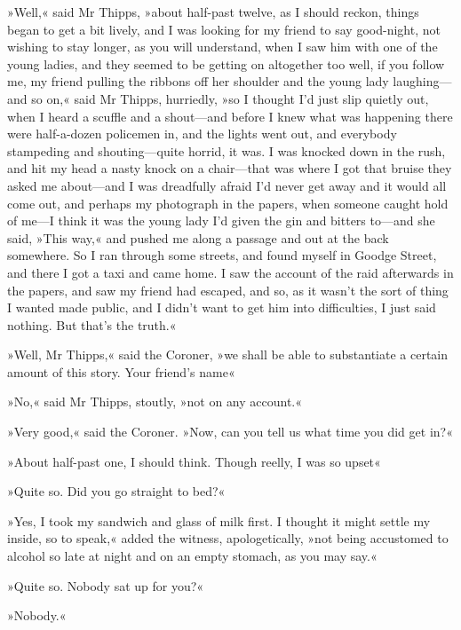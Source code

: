 »Well,« said Mr Thipps, »about half-past twelve, as I should reckon, things began to get a bit lively, and I was looking for my friend to say good-night, not wishing to stay longer, as you will understand, when I saw him with one of the young ladies, and they seemed to be getting on altogether too well, if you follow me, my friend pulling the ribbons off her shoulder and the young lady laughing\allowbreak---\allowbreak and so on,« said Mr Thipps, hurriedly, »so I thought I'd just slip quietly out, when I heard a scuffle and a shout\allowbreak---\allowbreak and before I knew what was happening there were half-a-dozen policemen in, and the lights went out, and everybody stampeding and shouting\allowbreak---\allowbreak quite horrid, it was. I was knocked down in the rush, and hit my head a nasty knock on a chair\allowbreak---\allowbreak that was where I got that bruise they asked me about\allowbreak---\allowbreak and I was dreadfully afraid I'd never get away and it would all come out, and perhaps my photograph in the papers, when someone caught hold of me\allowbreak---\allowbreak I think it was the young lady I'd given the gin and bitters to\allowbreak---\allowbreak and she said, »This way,« and pushed me along a passage and out at the back somewhere. So I ran through some streets, and found myself in Goodge Street, and there I got a taxi and came home. I saw the account of the raid afterwards in the papers, and saw my friend had escaped, and so, as it wasn't the sort of thing I wanted made public, and I didn't want to get him into difficulties, I just said nothing. But that's the truth.«

»Well, Mr Thipps,« said the Coroner, »we shall be able to substantiate a certain amount of this story. Your friend's name\longdash«

»No,« said Mr Thipps, stoutly, »not on any account.«

»Very good,« said the Coroner. »Now, can you tell us what time you did get in?«

»About half-past one, I should think. Though reelly, I was so upset\longdash«

»Quite so. Did you go straight to bed?«

»Yes, I took my sandwich and glass of milk first. I thought it might settle my inside, so to speak,« added the witness, apologetically, »not being accustomed to alcohol so late at night and on an empty stomach, as you may say.«

»Quite so. Nobody sat up for you?«

»Nobody.«

